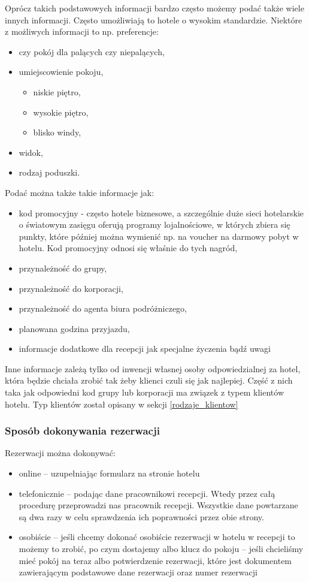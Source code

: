 \documentclass[a4paper,onecolumn,oneside,11pt,wide,floatssmall]{mwrep}
\theoremstyle{definition}
\theoremstyle{plain}%
\theoremstyle{remark}
\begin{document}
Oprócz takich podstawowych informacji bardzo często możemy podać także wiele 
innych informacji. Często umożliwiają to hotele o wysokim standardzie. Niektóre
z możliwych informacji to np. preferencje:
\begin{itemize}
  \item czy pokój dla palących czy niepalących,
  \item umiejscowienie pokoju,
  \begin{itemize}
    \item niskie piętro,
    \item wysokie piętro,
    \item blisko windy,
  \end{itemize}
  \item widok,
  \item rodzaj poduszki.
\end{itemize}

Podać można także takie informacje jak:
\begin{itemize}
  \item kod promocyjny - często hotele biznesowe, a szczególnie duże sieci
  hotelarskie o światowym zasięgu oferują programy lojalnościowe, w których
  zbiera się punkty, które później można wymienić np. na voucher na darmowy
  pobyt w hotelu. Kod promocyjny odnosi się właśnie do tych nagród,
  \item przynależność do grupy,
  \item przynależność do korporacji,
  \item przynależność do agenta biura podróżniczego,
  \item planowana godzina przyjazdu,
  \item informacje dodatkowe dla recepcji jak specjalne życzenia bądź uwagi
\end{itemize}

Inne informacje zależą tylko od inwencji własnej osoby odpowiedzialnej za hotel,
która będzie chciała zrobić tak żeby klienci czuli się jak najlepiej. Część z nich 
taka jak odpowiedni kod grupy lub korporacji ma związek z typem klientów hotelu.
Typ klientów został opisany w sekcji \ref{rodzaje_klientow}

\subsubsection{Sposób dokonywania rezerwacji}
Rezerwacji można dokonywać:
\begin{itemize}
  \item online – uzupełniając formularz na stronie hotelu
  \item telefonicznie – podając dane pracownikowi recepcji. Wtedy przez 
  całą procedurę przeprowadzi nas pracownik recepcji. Wszystkie dane powtarzane
  są dwa razy w celu sprawdzenia ich poprawności przez obie strony.
  \item osobiście – jeśli chcemy dokonać osobiście rezerwacji w hotelu w
  recepcji to możemy to zrobić, po czym dostajemy albo klucz do 
  pokoju – jeśli chcieliśmy mieć pokój na teraz albo potwierdzenie rezerwacji, 
  które jest dokumentem zawierającym podstawowe dane rezerwacji oraz 
  numer rezerwacji
\end{itemize}
\end{document}
